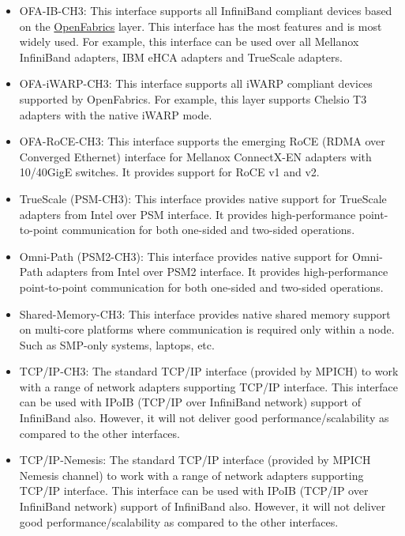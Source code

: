 \begin{itemize}
\item{OFA-IB-CH3: This interface supports all InfiniBand
        compliant devices based on the 
        \href{http://www.openfabrics.org}
        {OpenFabrics} layer. This
        interface has the most features and is most widely used. For
        example, this interface can be used over all Mellanox InfiniBand
        adapters, IBM eHCA adapters and TrueScale adapters.}

\item{OFA-iWARP-CH3: This interface supports all iWARP
        compliant devices supported by OpenFabrics. For example, this
        layer supports Chelsio T3 adapters with the native iWARP mode.}

\item {OFA-RoCE-CH3: This interface supports the 
        emerging RoCE (RDMA over Converged Ethernet) interface 
        for Mellanox ConnectX-EN adapters with 10/40GigE switches.
        It provides support for RoCE v1 and v2.} 
 
\item{TrueScale (PSM-CH3): This interface provides native support for TrueScale
        adapters from Intel over PSM interface. 
        It provides high-performance point-to-point communication 
        for both one-sided and two-sided operations.}

\item{Omni-Path (PSM2-CH3): This interface provides native support for Omni-Path
        adapters from Intel over PSM2 interface. 
        It provides high-performance point-to-point communication 
        for both one-sided and two-sided operations.}

\item {Shared-Memory-CH3:
        This interface provides native shared
        memory support on multi-core platforms where communication is
        required only within a node. Such as SMP-only systems, laptops,
        etc.}

\item{TCP/IP-CH3: The standard TCP/IP 
        interface (provided by MPICH) to work
        with a range of network adapters supporting TCP/IP interface. 
        This interface can be used with IPoIB
        (TCP/IP over InfiniBand network) support of InfiniBand also.
        However, it will not deliver good performance/scalability as
        compared to the other interfaces.}

\item {TCP/IP-Nemesis: The standard TCP/IP 
        interface (provided by 
        MPICH Nemesis channel) 
        to work with a range of network adapters supporting TCP/IP interface. 
        This interface can be used with IPoIB (TCP/IP over 
        InfiniBand network) support of 
        InfiniBand also. However, it will not deliver good 
        performance/scalability as 
        compared to the other interfaces.}


\end{itemize}
